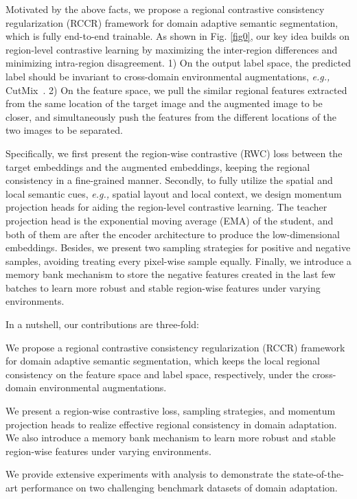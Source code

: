 \documentclass{article}
\begin{document}
Motivated by the above facts,  we propose a regional contrastive consistency regularization (RCCR) framework for domain adaptive semantic segmentation, which is fully end-to-end trainable. As shown in Fig. \ref{fig0}, our key idea builds on region-level contrastive learning by maximizing the inter-region differences and minimizing intra-region disagreement.
1) On the output label space, the predicted label should be invariant to cross-domain environmental augmentations, \emph{e.g.,} CutMix~\cite{french2019semi}. 2) On the feature space, we pull the similar regional features extracted from the same location of the target image and the augmented image to be closer, and simultaneously push the features from the different locations of the two images to be separated. 

Specifically, we first present the region-wise contrastive (RWC) loss between the target embeddings and the augmented embeddings, keeping the regional consistency in a fine-grained manner. Secondly, to fully utilize the spatial and local semantic cues, \emph{e.g.,} spatial layout and local context, we design momentum projection heads for aiding the region-level contrastive learning. The teacher projection head is the exponential moving average (EMA) of the student, and both of them are after the encoder architecture to produce the low-dimensional embeddings.
Besides, we present two sampling strategies for positive and negative samples,
avoiding treating every pixel-wise sample equally.
Finally, we introduce a memory bank mechanism to store the negative features created in the last few batches to learn more robust and stable region-wise features under varying environments. 




In a nutshell, our contributions are three-fold: 

 We propose a regional contrastive consistency regularization (RCCR) framework for domain adaptive semantic segmentation, which keeps the local regional consistency on the feature space and label space, respectively, under the cross-domain environmental augmentations. 
    
 We present a region-wise contrastive loss, sampling strategies, and momentum projection heads to realize effective regional consistency in domain adaptation. We also introduce a memory bank mechanism to learn more robust and stable region-wise features under varying environments. 


 We provide extensive experiments with analysis to demonstrate the state-of-the-art performance on two challenging benchmark datasets of domain adaptation.
\end{document}
